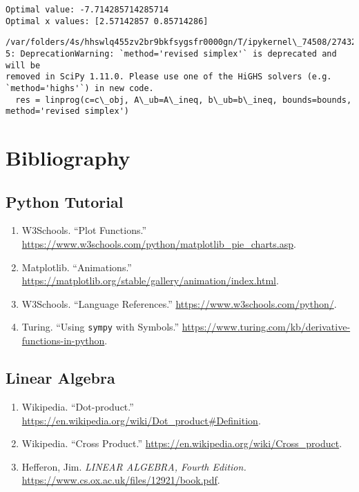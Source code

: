 \documentclass[11pt]{article}
\begin{document}
    \begin{Verbatim}[commandchars=\\\{\}]
Optimal value: -7.714285714285714
Optimal x values: [2.57142857 0.85714286]
    \end{Verbatim}

    \begin{Verbatim}[commandchars=\\\{\}]
/var/folders/4s/hhswlq455zv2br9bkfsygsfr0000gn/T/ipykernel\_74508/2743213689.py:2
5: DeprecationWarning: `method='revised simplex'` is deprecated and will be
removed in SciPy 1.11.0. Please use one of the HiGHS solvers (e.g.
`method='highs'`) in new code.
  res = linprog(c=c\_obj, A\_ub=A\_ineq, b\_ub=b\_ineq, bounds=bounds,
method='revised simplex')
    \end{Verbatim}

    \section{Bibliography}\label{bibliography}

\subsection{Python Tutorial}\label{python-tutorial}

\begin{enumerate}
\def\labelenumi{\arabic{enumi}.}
\item
  W3Schools. ``Plot Functions.''
  \url{https://www.w3schools.com/python/matplotlib_pie_charts.asp}.
\item
  Matplotlib. ``Animations.''
  \url{https://matplotlib.org/stable/gallery/animation/index.html}.
\item
  W3Schools. ``Language References.''
  \url{https://www.w3schools.com/python/}.
\item
  Turing. ``Using \texttt{sympy} with Symbols.''
  \url{https://www.turing.com/kb/derivative-functions-in-python}.
\end{enumerate}

\subsection{Linear Algebra}\label{linear-algebra}

\begin{enumerate}
\def\labelenumi{\arabic{enumi}.}
\setcounter{enumi}{4}
\item
  Wikipedia. ``Dot-product.''
  \url{https://en.wikipedia.org/wiki/Dot_product\#Definition}.
\item
  Wikipedia. ``Cross Product.''
  \url{https://en.wikipedia.org/wiki/Cross_product}.
\item
  Hefferon, Jim. \emph{LINEAR ALGEBRA, Fourth Edition.}
  \url{https://www.cs.ox.ac.uk/files/12921/book.pdf}.
\end{enumerate}
\end{document}

